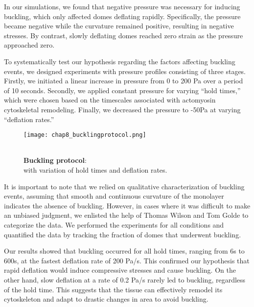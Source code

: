 In our simulations, we found that negative pressure was necessary for
inducing buckling, which only affected domes deflating rapidly.
Specifically, the pressure became negative while the curvature remained
positive, resulting in negative stresses. By contrast, slowly deflating
domes reached zero strain as the pressure approached zero.


To systematically test our hypothesis regarding the factors affecting
buckling events, we designed experiments with pressure profiles
consisting of three stages. Firstly, we initiated a linear increase in
pressure from 0 to 200 Pa over a period of 10 seconds. Secondly, we
applied constant pressure for varying ``hold times,'' which were chosen
based on the timescales associated with actomyosin cytoskeletal
remodeling. Finally, we decreased the pressure to -50Pa at varying
``deflation rates.''

\begin{figure}
	\begin{minipage}[c]{0.6\textwidth}
		\texttt{[image: chap8\_bucklingprotocol.png]}
	\end{minipage}\hfill
	\begin{minipage}[c]{0.35\textwidth}
		\caption{\\ \textbf{Buckling protocol}:\\ with variation of hold times and deflation rates.
		} \label{fig_8_2}
	\end{minipage}
\end{figure}

It is important to note that we relied on qualitative characterization
of buckling events, assuming that smooth and continuous curvature of the
monolayer indicates the absence of buckling. However, in cases where it
was difficult to make an unbiased judgment, we enlisted the help of
Thomas Wilson and Tom Golde to categorize the data. We performed the
experiments for all conditions and quantified the data by tracking the
fraction of domes that underwent buckling.

Our results showed that buckling occurred for all hold times, ranging
from 6s to 600s, at the fastest deflation rate of 200 Pa/s. This
confirmed our hypothesis that rapid deflation would induce compressive
stresses and cause buckling. On the other hand, slow deflation at a rate
of 0.2 Pa/s rarely led to buckling, regardless of the hold time. This
suggests that the tissue can effectively remodel its cytoskeleton and
adapt to drastic changes in area to avoid buckling.

